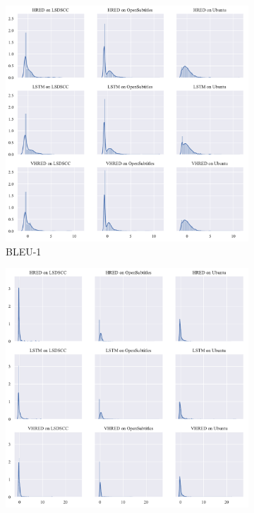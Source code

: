 \begin{figure}[H]
    \centering
    \begin{subfigure}{0.5\linewidth}
        \centering
        \includegraphics[width=\linewidth]{figure/distplot_grid/bleu_1/plot.pdf}
        \caption{BLEU-1}
    \end{subfigure}%
    \begin{subfigure}{0.5\linewidth}
        \centering
        \includegraphics[width=\linewidth]{figure/distplot_grid/bleu_2/plot.pdf}

\end{subfigure}
\end{figure}
